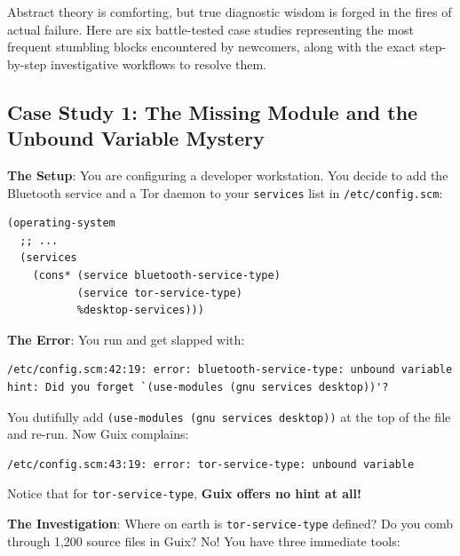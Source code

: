 Abstract theory is comforting, but true diagnostic wisdom is forged in the fires of actual failure. Here are six battle-tested case studies representing the most frequent stumbling blocks encountered by newcomers, along with the exact step-by-step investigative workflows to resolve them.

\subsection{Case Study 1: The Missing Module and the Unbound Variable Mystery}

\textbf{The Setup}: You are configuring a developer workstation. You decide to add the Bluetooth service and a Tor daemon to your \texttt{services} list in \texttt{/etc/config.scm}:

\begin{lstlisting}[style=guixscheme]
(operating-system
  ;; ...
  (services
    (cons* (service bluetooth-service-type)
           (service tor-service-type)
           %desktop-services)))
\end{lstlisting}

\textbf{The Error}: You run  and get slapped with:
\begin{lstlisting}[style=guixcli]
/etc/config.scm:42:19: error: bluetooth-service-type: unbound variable
hint: Did you forget `(use-modules (gnu services desktop))'?
\end{lstlisting}
You dutifully add \texttt{(use-modules (gnu services desktop))} at the top of the file and re-run. Now Guix complains:
\begin{lstlisting}[style=guixcli]
/etc/config.scm:43:19: error: tor-service-type: unbound variable
\end{lstlisting}
Notice that for \texttt{tor-service-type}, \textbf{Guix offers no hint at all!}

\textbf{The Investigation}: Where on earth is \texttt{tor-service-type} defined? Do you comb through 1,200 source files in Guix?
No! You have three immediate tools:

